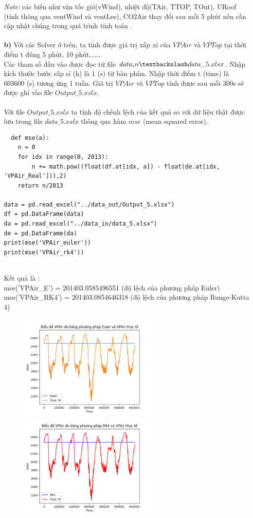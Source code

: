 \documentclass[a4paper]{article}
\begin{document}
\textit{Note: } các biến như vận tốc gió(vWind), nhiệt độ(TAir, TTOP, TOut), URoof (tính thông qua ventWind và ventLee), CO2Air thay đổi sau mỗi 5 phút nên cần cập nhật chúng trong quá trình tính toán .
\\\\
\textbf{b)}
Với các Solver ở trên, ta tính được giá trị xấp xỉ của $VPAir$ và $VPTop$ tại thời điểm t đúng 5 phút, 10 phút,.....
\\
Các tham số đầu vào được đọc từ file $data_in\textbackslash data\_5.xlsx$. Nhập kích thước bước sấp sỉ (h) là 1 (s) từ bàn phím. Nhập thời điểm t (time) là 603600 (s) tương ứng 1 tuần. Giá trị $VPAir$ và $VPTop$ tính được sau mỗi 300s sẽ được ghi vào file $Output\_5.xslx$.\\\\
Với file $Output\_5.xslx$ ta tính độ chênh lệch của kết quả so với dữ liệu thật được lưu trong file $data\_5.xslx$ thông qua hàm $mse$ (mean squared error).
\begin{verbatim}
  def mse(a):
    n = 0
    for idx in range(0, 2013):
        n += math.pow((float(df.at[idx, a]) - float(de.at[idx, 'VPAir_Real'])),2)
    return n/2013

data = pd.read_excel("../data_out/Output_5.xlsx")
df = pd.DataFrame(data)
da = pd.read_excel("../data_in/data_5.xlsx")
de = pd.DataFrame(da)
print(mse('VPAir_euler'))
print(mse('VPAir_rk4'))
\end{verbatim}
\\
Kết quả là :\\
mse('VPAir\_E') = 201403.0585496551 (độ lệch của phương pháp Euler)\\
mse('VPAir\_RK4') = 201403.0854646318 (độ lệch của phương pháp Runge-Kutta 4)\\

\begin{figure}[h]
\begin{center}
\includegraphics[width=7cm]{5b_euler.png}
\includegraphics[width=7cm]{5b_rk4.png}
\end{center}
\end{figure}
\end{document}
